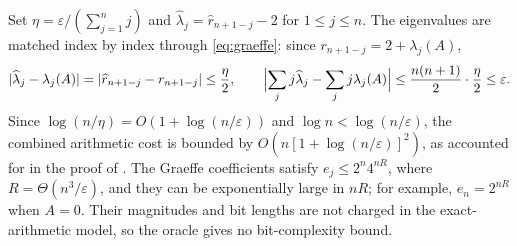 \documentclass[10pt,a4paper]{article}
\begin{document}
Set $\eta=\varepsilon/(\sum_{j=1}^n j)$ and
$\widehat\lambda_j=\widehat r_{n+1-j}-2$ for $1\leq j\leq n$.
The eigenvalues are matched index by index through
\eqref{eq:graeffe}: since $r_{n+1-j}=2+\lambda_j(A)$,
\[
|\widehat\lambda_j-\lambda_j(A)|
=|\widehat r_{n+1-j}-r_{n+1-j}|\leq\frac\eta2,
\qquad
\Bigl|\sum_jj\widehat\lambda_j-\sum_jj\lambda_j(A)\Bigr|
\leq\frac{n(n+1)}2\cdot\frac\eta2\leq\varepsilon.
\]
Since $\log(n/\eta)=O(1+\log(n/\varepsilon))$ and
$\log n<\log(n/\varepsilon)$, the combined arithmetic cost is bounded by
$O(n[1+\log(n/\varepsilon)]^2)$, as accounted for in the proof of
.
The Graeffe coefficients satisfy $e_j\leq2^n4^{nR}$, where
$R=\Theta(n^3/\varepsilon)$, and they can be exponentially large
in $nR$; for example, $e_n=2^{nR}$ when $A=0$. Their magnitudes
and bit lengths are not charged in the exact-arithmetic model,
so the oracle gives no bit-complexity bound.


\scriptsize{


}
\end{document}
